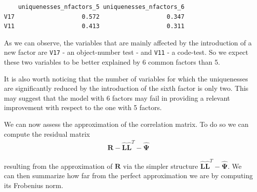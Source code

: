 \documentclass[
  letterpaper,
  DIV=11,
  numbers=noendperiod]{scrartcl}
\begin{document}
\begin{verbatim}
    uniquenesses_nfactors_5 uniquenesses_nfactors_6
V17                   0.572                   0.347
V11                   0.413                   0.311
\end{verbatim}

As we can observe, the variables that are mainly affected by the
introduction of a new factor are \texttt{V17} - an object-number test -
and \texttt{V11} - a code-test. So we expect these two variables to be
better explained by 6 common factors than 5.

It is also worth noticing that the number of variables for which the
uniquenesses are significantly reduced by the introduction of the sixth
factor is only two. This may suggest that the model with 6 factors may
fail in providing a relevant improvement with respect to the one with 5
factors.

We can now assess the approximation of the correlation matrix. To do so
we can compute the residual matrix \[
\begin{aligned}
  \mathbf{R} - \hat{\mathbf{L}}\hat{\mathbf{L}}^T - \hat{\mathbf{\Psi}}
\end{aligned}
\]

resulting from the approximation of \(\mathbf{R}\) via the simpler
structure \(\hat{\mathbf{L}}\hat{\mathbf{L}}^T - \hat{\mathbf{\Psi}}\).
We can then summarize how far from the perfect approximation we are by
computing its Frobenius norm.
\end{document}
